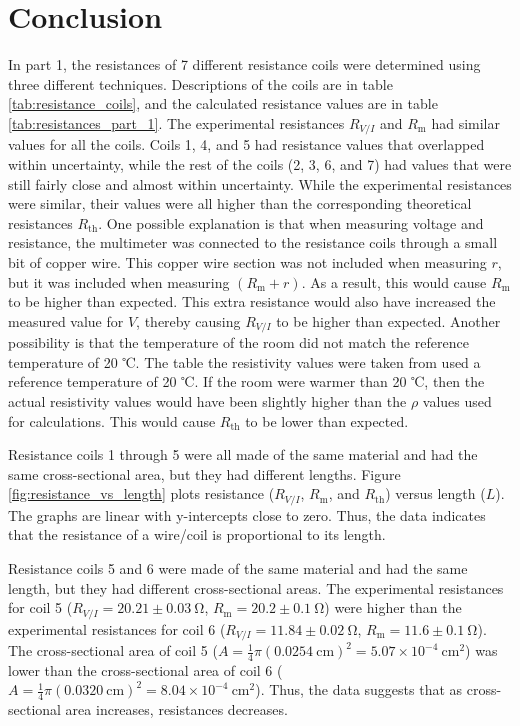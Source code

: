 \documentclass[12pt]{iopart} %
\gdef\sci#1#2{#1 \times 10^{#2}}
\gdef\units#1{~\mathrm{#1}}
\begin{document}
\section{Conclusion}

In part 1, the resistances of 7 different resistance coils were determined using three different techniques.
Descriptions of the coils are in table \ref{tab:resistance_coils}, and the calculated resistance values are in table \ref{tab:resistances_part_1}.
The experimental resistances $R_{V/I}$ and $R_\mathrm{m}$ had similar values for all the coils.
Coils 1, 4, and 5 had resistance values that overlapped within uncertainty, while the rest of the coils (2, 3, 6, and 7) had values that were still fairly close and almost within uncertainty.
While the experimental resistances were similar, their values were all higher than the corresponding theoretical resistances $R_\mathrm{th}$.
One possible explanation is that when measuring voltage and resistance, the multimeter was connected to the resistance coils through a small bit of copper wire.
This copper wire section was not included when measuring $r$, but it was included when measuring $(R_\mathrm{m} + r)$.
As a result, this would cause $R_\mathrm{m}$ to be higher than expected.
This extra resistance would also have increased the measured value for $V$, thereby causing $R_{V/I}$ to be higher than expected.
Another possibility is that the temperature of the room did not match the reference temperature of 20 ℃.
The table the resistivity values were taken from used a reference temperature of 20 ℃.
If the room were warmer than 20 ℃, then the actual resistivity values would have been slightly higher than the $\rho$ values used for calculations.
This would cause $R_\mathrm{th}$ to be lower than expected.

Resistance coils 1 through 5 were all made of the same material and had the same cross-sectional area, but they had different lengths.
Figure \ref{fig:resistance_vs_length} plots resistance ($R_{V/I}$, $R_\mathrm{m}$, and $R_\mathrm{th}$) versus length ($L$).
The graphs are linear with y-intercepts close to zero.
Thus, the data indicates that the resistance of a wire/coil is proportional to its length.

Resistance coils 5 and 6 were made of the same material and had the same length, but they had different cross-sectional areas.
The experimental resistances for coil 5 ($R_{V/I} = 20.21 \pm 0.03 \units{\Omega}$, $R_\mathrm{m} = 20.2 \pm 0.1 \units{\Omega}$) were higher than the experimental resistances for coil 6 ($R_{V/I} = 11.84 \pm 0.02 \units{\Omega}$, $R_\mathrm{m} = 11.6 \pm 0.1 \units{\Omega}$).
The cross-sectional area of coil 5 ($A = \frac{1}{4} \pi (0.0254 \units{cm})^2 = \sci{5.07}{-4} \units{cm^2}$) was lower than the cross-sectional area of coil 6 ($A = \frac{1}{4} \pi (0.0320 \units{cm})^2 = \sci{8.04}{-4} \units{cm^2}$).
Thus, the data suggests that as cross-sectional area increases, resistances decreases.
\end{document}
